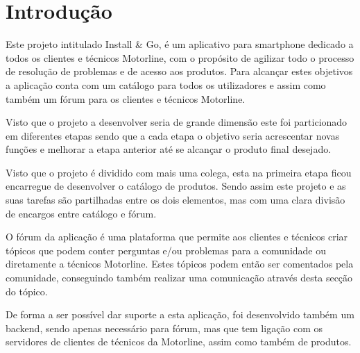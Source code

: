 
\chapter{Introdução}
Este projeto intitulado Install \& Go, é um aplicativo para smartphone dedicado a todos os clientes e 
técnicos Motorline, com o propósito de agilizar todo o processo de resolução de problemas e de acesso 
aos produtos. Para alcançar estes objetivos a aplicação conta com um catálogo para todos os utilizadores 
e assim como também um fórum para os clientes e técnicos Motorline.

Visto que o projeto a desenvolver seria de grande dimensão este foi particionado em diferentes etapas 
sendo que a cada etapa o objetivo seria acrescentar novas funções e melhorar a etapa anterior até se 
alcançar o produto final desejado.

Visto que o projeto é dividido com mais uma colega, esta na primeira etapa ficou encarregue de desenvolver 
o catálogo de produtos. Sendo assim este projeto e as suas tarefas são partilhadas entre os dois elementos, 
mas com uma clara divisão de encargos entre catálogo e fórum.


O fórum da aplicação é uma plataforma que permite aos clientes e técnicos criar tópicos que podem conter 
perguntas e/ou problemas para a comunidade ou diretamente a técnicos Motorline. Estes tópicos podem então 
ser comentados pela comunidade, conseguindo também realizar uma comunicação através desta secção do tópico.

De forma a ser possível dar suporte a esta aplicação, foi desenvolvido também um backend, sendo apenas 
necessário para fórum, mas que tem ligação com os servidores de clientes de técnicos da Motorline, assim 
como também de produtos.



